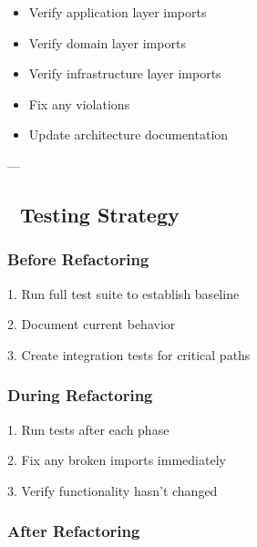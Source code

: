 \documentclass[11pt,a4paper]{article}
\begin{document}
\begin{itemize}
\item [ ] Verify application layer imports
\end{itemize}

\begin{itemize}
\item [ ] Verify domain layer imports
\end{itemize}

\begin{itemize}
\item [ ] Verify infrastructure layer imports
\end{itemize}

\begin{itemize}
\item [ ] Fix any violations
\end{itemize}

\begin{itemize}
\item [ ] Update architecture documentation
\end{itemize}

---

\subsection{🧪 Testing Strategy}

\subsubsection{Before Refactoring}

1. Run full test suite to establish baseline

2. Document current behavior

3. Create integration tests for critical paths

\subsubsection{During Refactoring}

1. Run tests after each phase

2. Fix any broken imports immediately

3. Verify functionality hasn't changed

\subsubsection{After Refactoring}
\end{document}
